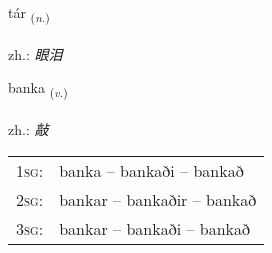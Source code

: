 \documentclass[frontgrid, backgrid]{flacards}\usepackage[]{graphicx}\usepackage[]{xcolor}
\begin{document}
\renewcommand{\blhead}{\vskip5pt {\small\bfseries\footnotesize Nafnorð | 名词 }}
\renewcommand{\bcfoot}{\vskip5pt \hspace{2pt}{\small\bfseries\footnotesize 3K}}


{tár \small{\textsubscript{(\textit{n.})}} \\[1ex] %
\textphonetic{[tʰauːr]} \\
zh.: \emph{眼泪} \\  [2ex]
\renewcommand*{\arraystretch}{0.8}
}

\renewcommand{\flhead}{\vskip5pt \fboxsep=0pt {\small\bfseries\footnotesize Sagnorð | 动词}}
\renewcommand{\fcfoot}{\vskip5pt \fboxsep=0pt \hspace{2pt}{\small\bfseries\footnotesize 3K}}

\renewcommand{\blhead}{\vskip5pt {\small\bfseries\footnotesize Sagnorð | 动词 }}
\renewcommand{\bcfoot}{\vskip5pt \hspace{2pt}{\small\bfseries\footnotesize 3K}}


{banka \small{\textsubscript{(\textit{v.})}} \\[1ex] %
\textphonetic{[pauŋ̥ka]} \\
zh.: \emph{敲} \\  [2ex]
\renewcommand*{\arraystretch}{0.8}
\begin{tabular}{p{1cm}l}
\textsc{1sg}: & banka -- bankaði -- bankað \\ 
\textsc{2sg}: & bankar -- bankaðir -- bankað \\ 
\textsc{3sg}: & bankar -- bankaði -- bankað \\ 
\end{tabular}
}

\renewcommand{\flhead}{\vskip5pt \fboxsep=0pt {\small\bfseries\footnotesize Lýsingarorð | 形容词}}
\renewcommand{\fcfoot}{\vskip5pt \fboxsep=0pt \hspace{2pt}{\small\bfseries\footnotesize 3K}}
\end{document}
